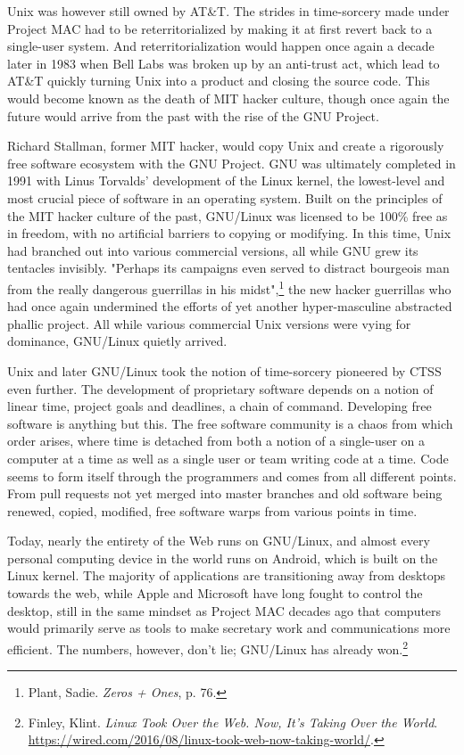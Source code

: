 \documentclass[10pt, statementpaper, twoside, openright]{memoir}
\begin{document}
Unix was however still owned by AT\&T. The strides in time-sorcery made under Project MAC had to be reterritorialized by making it at first revert back to a single-user system. And reterritorialization would happen once again a decade later in 1983 when Bell Labs was broken up by an anti-trust act, which lead to AT\&T quickly turning Unix into a product and closing the source code. This would become known as the death of MIT hacker culture, though once again the future would arrive from the past with the rise of the GNU Project.

Richard Stallman, former MIT hacker, would copy Unix and create a rigorously free software ecosystem with the GNU Project. GNU was ultimately completed in 1991 with Linus Torvalds' development of the Linux kernel, the lowest-level and most crucial piece of software in an operating system. Built on the principles of the MIT hacker culture of the past, GNU/Linux was licensed to be 100\% free as in freedom, with no artificial barriers to copying or modifying. In this time, Unix had branched out into various commercial versions, all while GNU grew its tentacles invisibly. "Perhaps its campaigns even served to distract bourgeois man from the really dangerous guerrillas in his midst",\footnote{Plant, Sadie. \textit{Zeros + Ones}, p. 76.} the new hacker guerrillas who had once again undermined the efforts of yet another hyper-masculine abstracted phallic project. All while various commercial Unix versions were vying for dominance, GNU/Linux quietly arrived.

Unix and later GNU/Linux took the notion of time-sorcery pioneered by CTSS even further. The development of proprietary software depends on a notion of linear time, project goals and deadlines, a chain of command. Developing free software is anything but this. The free software community is a chaos from which order arises, where time is detached from both a notion of a single-user on a computer at a time as well as a single user or team writing code at a time. Code seems to form itself through the programmers and comes from all different points. From pull requests not yet merged into master branches and old software being renewed, copied, modified, free software warps from various points in time.

Today, nearly the entirety of the Web runs on GNU/Linux, and almost every personal computing device in the world runs on Android, which is built on the Linux kernel. The majority of applications are transitioning away from desktops towards the web, while Apple and Microsoft have long fought to control the desktop, still in the same mindset as Project MAC decades ago that computers would primarily serve as tools to make secretary work and communications more efficient. The numbers, however, don't lie; GNU/Linux has already won.\footnote{Finley, Klint. \textit{Linux Took Over the Web. Now, It's Taking Over the World}. \href{https://www.wired.com/2016/08/linux-took-web-now-taking-world/}{https://wired.com/2016/08/linux-took-web-now-taking-world/}.}
\end{document}
